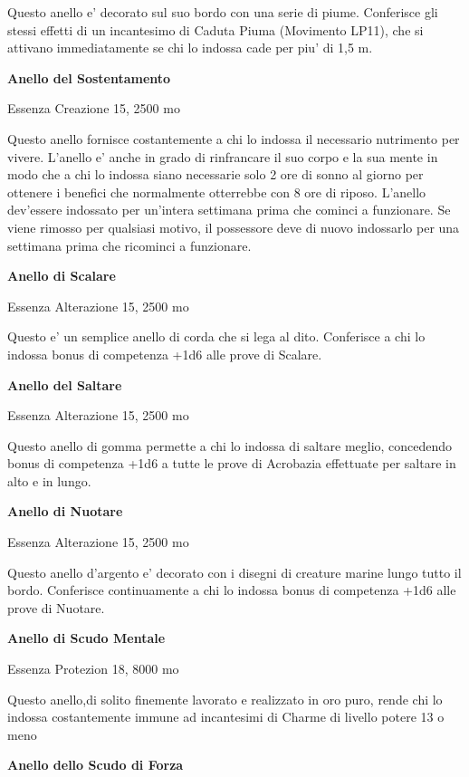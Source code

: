 \documentclass[a4paper,11pt,twoside,openany]{dndbook}
\begin{document}
{Questo anello e' decorato sul suo bordo con una serie di piume. Conferisce gli stessi effetti di un incantesimo di Caduta Piuma (Movimento LP11), che si attivano immediatamente se chi lo indossa cade per piu' di 1,5 m. 

\textbf{Anello del Sostentamento}

Essenza Creazione 15, 2500 mo

Questo anello fornisce costantemente a chi lo indossa il necessario nutrimento per vivere. L'anello e' anche in grado di rinfrancare il suo corpo e la sua mente in modo che a chi lo indossa siano necessarie solo 2 ore di sonno al giorno per ottenere i benefici che normalmente otterrebbe con 8 ore di riposo. L'anello dev'essere indossato per un'intera settimana prima che cominci a funzionare. Se viene rimosso per qualsiasi motivo, il possessore deve di nuovo indossarlo per una settimana prima che ricominci a funzionare.

\textbf{Anello di Scalare}

Essenza Alterazione 15, 2500 mo

Questo e' un semplice anello di corda che si lega al dito. Conferisce a chi lo indossa bonus di competenza +1d6 alle prove di Scalare.

\textbf{Anello del Saltare}

Essenza Alterazione 15, 2500 mo

Questo anello di gomma permette a chi lo indossa di saltare meglio, concedendo bonus di competenza +1d6 a tutte le prove di Acrobazia effettuate per saltare in alto e in lungo.

\textbf{Anello di Nuotare}

Essenza Alterazione 15, 2500 mo

Questo anello d'argento e' decorato con i disegni di creature marine lungo tutto il bordo. Conferisce continuamente a chi lo indossa bonus di competenza +1d6 alle prove di Nuotare.

\textbf{Anello di Scudo Mentale}

Essenza Protezion 18, 8000 mo

Questo anello,di solito finemente lavorato e realizzato in oro puro, rende chi lo indossa costantemente immune ad incantesimi di Charme di livello potere 13 o meno

\textbf{Anello dello Scudo di Forza}

}
\end{document}
